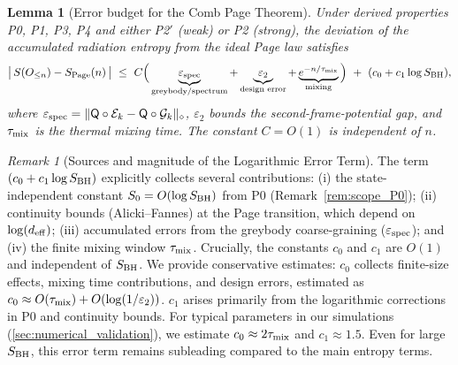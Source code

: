 \documentclass[a4paper,11pt]{article}
\theoremstyle{plain}
\newtheorem{lemma}{Lemma}
\theoremstyle{definition}
\theoremstyle{remark}
\newtheorem{remark}{Remark}
\begin{document}
\begin{lemma}[Error budget for the Comb Page Theorem]
\label{lem:comb-error-budget}
Under derived properties P0, P1, P3, P4 and either P2$'$ (weak) or P2 (strong),
the deviation of the accumulated radiation entropy from the ideal Page law satisfies
\[
\big|\,S(O_{\le n}) - S_{\rm Page}(n)\,\big|
\ \le\ C\Big( \underbrace{\varepsilon_{\rm spec}}_{\text{greybody/spectrum}} 
+ \underbrace{\varepsilon_2}_{\text{design error}}
+ \underbrace{e^{-n/\tau_{\rm mix}}}_{\text{mixing}} \Big)
\ +\ (c_0 + c_1\log S_{\rm BH}),
\]
where $\varepsilon_{\rm spec}=\|\mathsf{Q}\circ \mathcal{E}_k - \mathsf{Q}\circ \mathcal{G}_k\|_\diamond$,
$\varepsilon_2$ bounds the second-frame-potential gap, and $\tau_{\rm mix}$ is the thermal mixing time.
The constant $C=O(1)$ is independent of $n$.
\end{lemma}
\begin{remark}[Sources and magnitude of the Logarithmic Error Term]
\label{rem:log_error_sources}
The term $(c_0 + c_1\log S_{\rm BH})$ explicitly collects several contributions: (i) the state-independent constant $S_0=O(\log S_{\rm BH})$ from P0 (Remark~\ref{rem:scope_P0}); (ii) continuity bounds (Alicki--Fannes) at the Page transition, which depend on $\log(d_{\rm eff})$; (iii) accumulated errors from the greybody coarse-graining ($\varepsilon_{\rm spec}$); and (iv) the finite mixing window $\tau_{\rm mix}$.
Crucially, the constants $c_0$ and $c_1$ are $O(1)$ and independent of $S_{\rm BH}$. We provide conservative estimates: $c_0$ collects finite-size effects, mixing time contributions, and design errors, estimated as $c_0 \approx O(\tau_{\rm mix}) + O(\log(1/\varepsilon_2))$. $c_1$ arises primarily from the logarithmic corrections in P0 and continuity bounds. For typical parameters in our simulations (\cref{sec:numerical_validation}), we estimate $c_0 \approx 2\tau_{\rm mix}$ and $c_1 \approx 1.5$. Even for large $S_{\rm BH}$, this error term remains subleading compared to the main entropy terms.
\end{remark}
\end{document}
